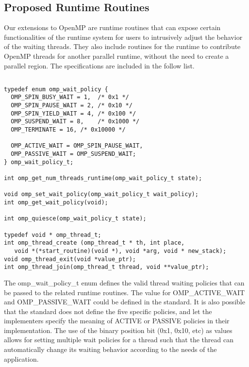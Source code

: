 \subsection{Proposed Runtime Routines} 
Our extensions to OpenMP are runtime routines that can expose 
certain functionalities of the runtime system for users to 
intrusively adjust the behavior of the waiting threads.  
They also include routines for the runtime to contribute OpenMP threads for another parallel runtime, without
the need to create a {\sf parallel} region. The specifications are included in the follow list. 

\lstset{basicstyle=\sffamily\footnotesize,language=c, numbersep=1pt}
\begin{lstlisting}[frame=single]  % Start your code-block

typedef enum omp_wait_policy {
  OMP_SPIN_BUSY_WAIT = 1,  /* 0x1 */
  OMP_SPIN_PAUSE_WAIT = 2, /* 0x10 */
  OMP_SPIN_YIELD_WAIT = 4, /* 0x100 */
  OMP_SUSPEND_WAIT = 8,    /* 0x1000 */
  OMP_TERMINATE = 16, /* 0x10000 */

  OMP_ACTIVE_WAIT = OMP_SPIN_PAUSE_WAIT,
  OMP_PASSIVE_WAIT = OMP_SUSPEND_WAIT;
} omp_wait_policy_t; 

int omp_get_num_threads_runtime(omp_wait_policy_t state);

void omp_set_wait_policy(omp_wait_policy_t wait_policy);
int omp_get_wait_policy(void);

int omp_quiesce(omp_wait_policy_t state);

typedef void * omp_thread_t;
int omp_thread_create (omp_thread_t * th, int place,  
   void *(*start_routine)(void *), void *arg, void * new_stack);
void omp_thread_exit(void *value_ptr);
int omp_thread_join(omp_thread_t thread, void **value_ptr);

\end{lstlisting}
The {\sf omp\_wait\_policy\_t} enum defines the valid thread waiting policies that can be passed to the 
related runtime routines. The value for {\sf OMP\_ACTIVE\_WAIT} and {\sf OMP\_PASSIVE\_WAIT} could be defined
in the standard. It is also possible that the standard does not define the five specific policies, and let 
the implementers specify the meaning of {\sf ACTIVE} or {\sf PASSIVE} policies in their implementation. The use of the binary
position bit (0x1, 0x10, etc) as values allows for setting multiple wait policies for a thread such that the thread can automatically change
its waiting behavior according to the needs of the application. 


